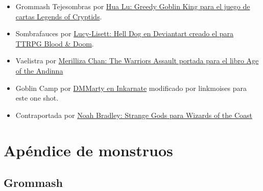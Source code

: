\documentclass[10pt,twoside,twocolumn,openany]{dndbook}
\begin{document}
\begin{itemize}
  \item Grommash Tejesombras por \href{https://legendofthecryptids.fandom.com/wiki/Greedy_Goblin_King}{Hua Lu: Greedy Goblin King para el juego de cartas Legends of Cryptids}.
  \item Sombrafauces por \href{https://www.deviantart.com/lucy-lisett/art/Death-Dog-901248620}{Lucy-Lisett: Hell Dog en Deviantart creado el para TTRPG Blood \& Doom}.
  \item Vaelistra por \href{https://www.artstation.com/artwork/aRZ92J}{Merilliza Chan: The Warriors Assault portada para el libro Age of the Andinna}
  \item Goblin Camp por \href{https://inkarnate.com/m/zkNwn5--goblin-camp/}{DMMarty en Inkarnate} modificado por linkmoises para este one shot.
  \item Contraportada por \href{https://www.deviantart.com/noahbradley/art/Strange-Gods-205766996}{Noah Bradley: Strange Gods para Wizards of the Coast}
\end{itemize}

\part*{Apéndice de monstruos}

\chapter*{Grommash}
\end{document}
